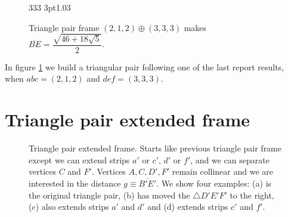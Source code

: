 \documentclass[11pt]{article}
\begin{document}
\begin{figure}[H]
\centering
\begin{center}
 {3}{3}{3} {3pt}{1.0}{3} %
\end{center}
\caption{Triangle pair frame $(2,1,2) \oplus (3,3,3)$ makes $\overline{BE} = \dfrac{\sqrt{46+18\sqrt{5}}}{2}$.}
\label{fig:tripair212333}
\end{figure}

In figure \ref{fig:tripair212333} we build a triangular pair following one of the last report results, when $abc=(2,1,2)$ and $def=(3,3,3)$.


\section{Triangle pair extended frame}

\begin{figure}[H]
 \centering
 \caption{Triangle pair extended frame. Starts like previous triangle pair frame except
 we can extend strips $a'$ or $c'$, $d'$ or $f'$, and we can separate vertices $C$ and $F'$.
 Vertices $A,C,D',F'$ remain collinear and we are interested in the distance $g \equiv \overline{B'E'}$. We show four examples: (a) is the original triangle pair,
 (b) has moved the $\triangle{D'E'F'}$ to the right,
 (c) also extends strips $a'$ and $d'$ and (d) extends strips $c'$ and $f'$.
 }
 \label{fig:tripairext}
\end{figure}
\end{document}
